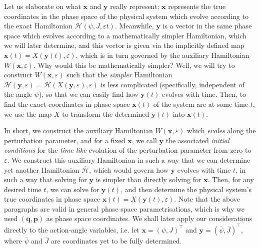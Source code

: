 \vspace*{2.5pt}

\quad Let us elaborate on what $\mathbf{x}$ and $\mathbf{y}$ really represent; $\mathbf{x}$ represents the true coordinates in the phase space of the physical system which evolve according to the exact Hamiltonian $\mathcal{H}(\psi, J, \varepsilon t)$. Meanwhile, $\mathbf{y}$ is a vector in the same phase space which evolves according to a mathematically simpler Hamiltonian, which we will later determine, and this vector is given via the implicitly defined map $\mathbf{x}(t)=X(\mathbf{y}(t),\varepsilon)$, which is in turn governed by the auxiliary Hamiltonian $W(\mathbf{x},\varepsilon)$. Why would this be mathematically simpler? Well, we will try to construct $W(\mathbf{x},\varepsilon)$ such that the \textit{simpler} Hamiltonian $\overline{\mathcal{H}}(\mathbf{y},\varepsilon)=\mathcal{H}\left(X(\mathbf{y},\varepsilon),\varepsilon\right)$ is less complicated (specifically, independent of the angle $\psi$), so that we can easily find how $\mathbf{y}(t)$ evolves with time. Then, to find the exact coordinates in phase space $\mathbf{x}(t)$ of the system are at some time $t$, we use the map $X$ to transform the determined $\mathbf{y}(t)$ into $\mathbf{x}(t)$.

\vspace*{2.5pt}

\quad In short, we construct the auxiliary Hamiltonian $W(\mathbf{x},\varepsilon)$ which \textit{evoles} along the perturbation parameter, and for a fixed $\mathbf{x}$, we call $\mathbf{y}$ the associated \textit{initial conditions} for the \textit{time-like} evolution of the perturbation parameter from zero to $\varepsilon$. We construct this auxiliary Hamiltonian in such a way that we can determine yet another Hamiltonian $\overline{\mathcal{H}}$, which would govern how $\mathbf{y}$ evolves with time $t$, in such a way that solving for $\mathbf{y}$ is simpler than directly solving for $\mathbf{x}$. Then, for any desired time $t$, we can solve for $\mathbf{y}(t)$, and then determine the physical system's true coordinates in phase space $\mathbf{x}(t)=X(\mathbf{y}(t),\varepsilon)$. Note that the above paragraphs are valid in general phase space parametrisations, which is why we used $(\mathbf{q},\mathbf{p})$ as phase space coordinates. We shall later apply our considerations directly to the action-angle variables, i.e. let $\mathbf{x}=(\psi, J)^\top$ and $\mathbf{y}=(\overline{\psi},\overline{J})^\top$, where $\overline{\psi}$ and $\overline{J}$ are coordinates yet to be fully determined.


